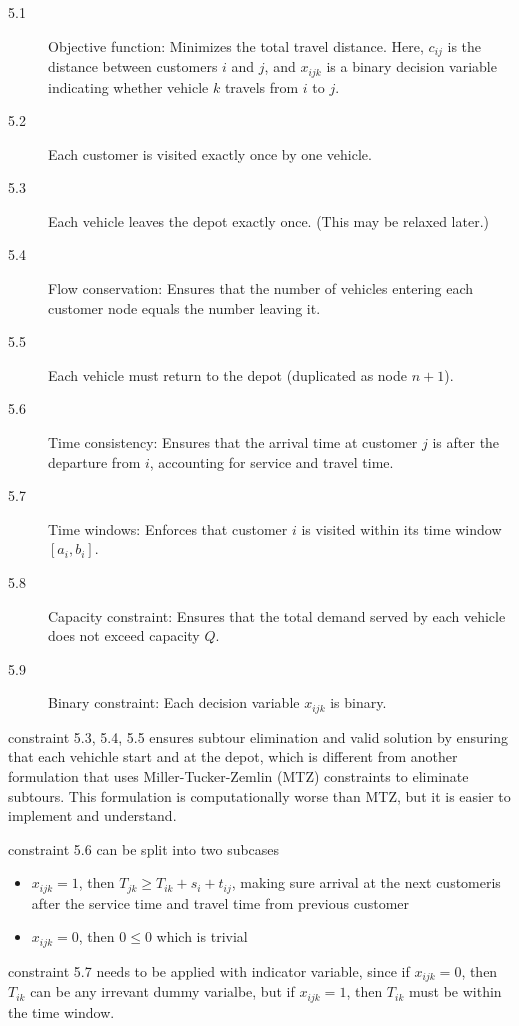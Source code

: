 \documentclass[twocolumn, 10pt]{article}
\begin{document}
\begin{description}
    \item[5.1] Objective function: Minimizes the total travel distance. Here, $c_{ij}$ is the distance between customers $i$ and $j$, and $x_{ijk}$ is a binary decision variable indicating whether vehicle $k$ travels from $i$ to $j$.
    
    \item[5.2] Each customer is visited exactly once by one vehicle.

    \item[5.3] Each vehicle leaves the depot exactly once. (This may be relaxed later.)

    \item[5.4] Flow conservation: Ensures that the number of vehicles entering each customer node equals the number leaving it.

    \item[5.5] Each vehicle must return to the depot (duplicated as node $n+1$).

    \item[5.6] Time consistency: Ensures that the arrival time at customer $j$ is after the departure from $i$, accounting for service and travel time.

    \item[5.7] Time windows: Enforces that customer $i$ is visited within its time window $[a_i, b_i]$.

    \item[5.8] Capacity constraint: Ensures that the total demand served by each vehicle does not exceed capacity $Q$.

    \item[5.9] Binary constraint: Each decision variable $x_{ijk}$ is binary.
\end{description}

constraint 5.3, 5.4, 5.5 ensures subtour elimination and valid solution by ensuring that each vehichle start and at the depot, 
which is different from another formulation that uses Miller-Tucker-Zemlin (MTZ) constraints to eliminate subtours.
This formulation is computationally worse than MTZ, but it is easier to implement and understand.

constraint 5.6 can be split into two
subcases
\begin{itemize}
    \item $x_{ijk} = 1$, then $T_{jk} \geq T_{ik} + s_i + t_{ij}$, making sure arrival at the next customeris after the service time and travel time from previous customer
    \item $x_{ijk} = 0$, then $0\leq 0$ which is trivial
\end{itemize}
constraint 5.7 needs to be applied with indicator variable, since if $x_{ijk} = 0$, then $T_{ik}$ can be any irrevant dummy varialbe, but if $x_{ijk} = 1$, then $T_{ik}$ must be within the time window.
\end{document}

